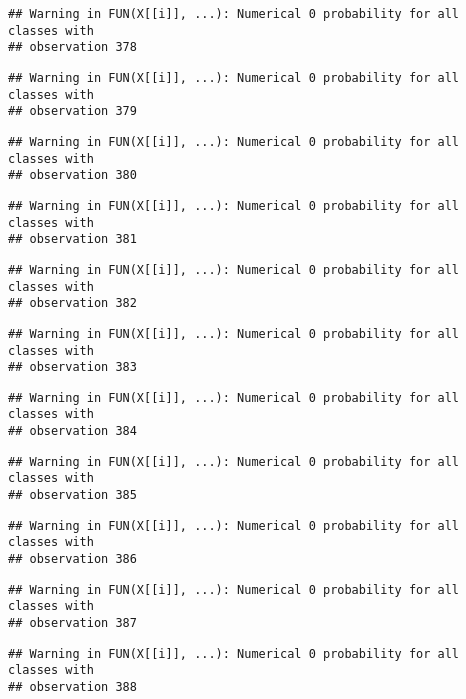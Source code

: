 \documentclass[
]{article}
\begin{document}
\begin{verbatim}
## Warning in FUN(X[[i]], ...): Numerical 0 probability for all classes with
## observation 378
\end{verbatim}

\begin{verbatim}
## Warning in FUN(X[[i]], ...): Numerical 0 probability for all classes with
## observation 379
\end{verbatim}

\begin{verbatim}
## Warning in FUN(X[[i]], ...): Numerical 0 probability for all classes with
## observation 380
\end{verbatim}

\begin{verbatim}
## Warning in FUN(X[[i]], ...): Numerical 0 probability for all classes with
## observation 381
\end{verbatim}

\begin{verbatim}
## Warning in FUN(X[[i]], ...): Numerical 0 probability for all classes with
## observation 382
\end{verbatim}

\begin{verbatim}
## Warning in FUN(X[[i]], ...): Numerical 0 probability for all classes with
## observation 383
\end{verbatim}

\begin{verbatim}
## Warning in FUN(X[[i]], ...): Numerical 0 probability for all classes with
## observation 384
\end{verbatim}

\begin{verbatim}
## Warning in FUN(X[[i]], ...): Numerical 0 probability for all classes with
## observation 385
\end{verbatim}

\begin{verbatim}
## Warning in FUN(X[[i]], ...): Numerical 0 probability for all classes with
## observation 386
\end{verbatim}

\begin{verbatim}
## Warning in FUN(X[[i]], ...): Numerical 0 probability for all classes with
## observation 387
\end{verbatim}

\begin{verbatim}
## Warning in FUN(X[[i]], ...): Numerical 0 probability for all classes with
## observation 388
\end{verbatim}
\end{document}
